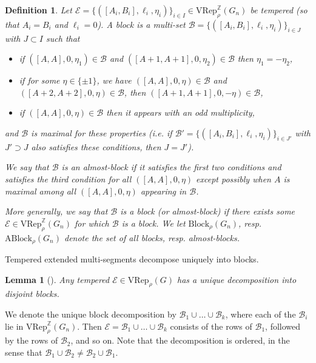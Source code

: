\documentclass[11pt,letterpaper]{amsart}
\newcommand{\VRep}{{\mathrm{VRep}}}
\newcommand{\BB}{\mathcal{B}}
\newcommand{\EE}{\mathcal{E}}
\newcommand{\Block}{\mathrm{Block}}
\newcommand{\ABlock}{\mathrm{ABlock}}
\newtheorem{lemma}[thm]{Lemma}
\newtheorem{defn}[thm]{Definition}
\numberwithin{equation}{section}
\begin{document}
\begin{defn}
\label{def-block}
    Let $\EE = \{([A_i, B_i], \ell_i, \eta_i)\}_{i \in I}\in \VRep_\rho^\mathbb{Z}(G_n)$ be  tempered (so that $A_i = B_i$ and $\ell_i = 0$). A \emph{block} is a multi-set $\mathcal{B} = \{([A_i, B_i], \ell_i, \eta_i)\}_{i \in J}$ with $J \subset I$ such that
    \begin{itemize}
        \item if $([A, A], 0, \eta_1)\in\mathcal{B}$ and $([A+1, A+1], 0, \eta_2)\in\mathcal{B}$ then $\eta_1 = - \eta_2$,
        \item if for some $\eta\in\{\pm1\}$, we have $([A, A], 0, \eta)\in\mathcal{B}$ and $([A+2, A+2], 0, \eta)\in\mathcal{B}$, then $([A+1, A+1], 0, -\eta)\in\mathcal{B}$,
        \item if $([A, A], 0, \eta)\in\mathcal{B}$ then it appears with an odd multiplicity,
    \end{itemize}
    and $\mathcal{B}$ is maximal for these properties (i.e. if $\mathcal{B}' = \{([A_i, B_i], \ell_i, \eta_i)\}_{i \in J'}$ with $J' \supset J$ also satisfies these conditions, then $J = J'$).

    We say that $\mathcal{B}$ is an \emph{almost-block} if it satisfies the first two conditions and satisfies the third condition for all $([A, A], 0, \eta)$ except possibly when $A$ is maximal among all $([A, A], 0, \eta)$ appearing in $\mathcal{B}$.

    More generally, we say that $\mathcal{B}$ is a block (or almost-block) if there exists some $\EE\in  \VRep_\rho^\mathbb{Z}(G_n)$ for which $\mathcal{B}$ is a block. We let $\Block_\rho(G_n)$, resp. $\ABlock_\rho(G_n)$ denote the set of all blocks, resp. almost-blocks.
\end{defn}


Tempered extended multi-segments decompose uniquely into blocks.

\begin{lemma}[{\cite[Lemma 3.4]{HKT26}}]\label{lem-unique-block-decomp}
    Any tempered  $\EE\in \VRep_\rho(G)$ has a unique decomposition into disjoint blocks.
\end{lemma}

We denote the unique block decomposition by $\BB_1 \cup \dots \cup \BB_k$, where each of the $\BB_i$ lie in $\VRep_\rho^\mathbb{Z}(G_n)$. Then $\EE = \BB_1 \cup \dots \cup \BB_k$ consists of the rows of $\BB_1$, followed by the rows of $\BB_2$, and so on. Note that the decomposition is ordered, in the sense that $\BB_1 \cup \BB_2 \neq \BB_2 \cup \BB_1$. 
\end{document}

